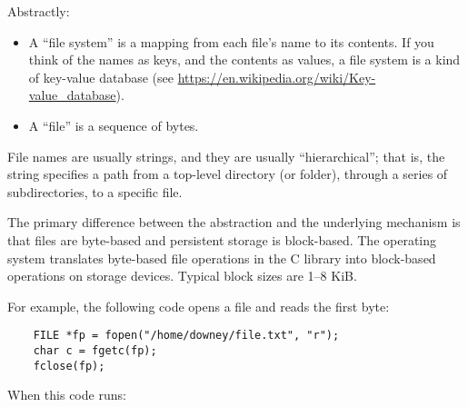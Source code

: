 \documentclass[12pt]{book}
\begin{document}
Abstractly:

\begin{itemize}

\item A ``file system'' is a mapping from each file's name to its contents.
If you think of the names as keys, and the contents as values,
a file system is a kind of key-value database
(see \url{https://en.wikipedia.org/wiki/Key-value_database}).

\item A ``file'' is a sequence of bytes.

\end{itemize}

File names are usually strings, and they are usually ``hierarchical'';
that is, the string specifies a path from a top-level directory (or
folder), through a series of subdirectories, to a specific file.

The primary difference between the abstraction and the underlying
mechanism is that files are byte-based and persistent storage is
block-based.  The operating system translates byte-based file operations 
in the C library into block-based operations on storage devices.
Typical block sizes are 1--8 KiB.

For example, the following code opens a file and reads the first byte:

\begin{verbatim}
    FILE *fp = fopen("/home/downey/file.txt", "r");
    char c = fgetc(fp);
    fclose(fp);
\end{verbatim}

When this code runs:
\end{document}

